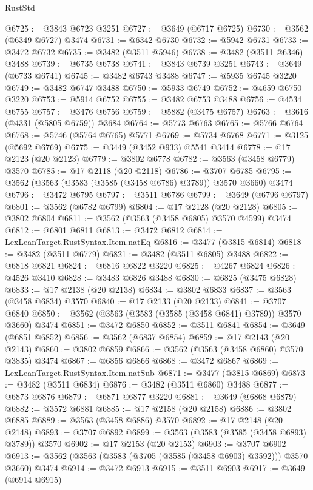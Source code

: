 \begin{lexlean}{RustStd}
\begin{coremodule}
{\begin{coremodule}
{{{{{{{{{{{{{{{{{{{{{{{{{{{{{{{{{{{{{{{{{{{{{@6725 := @3843 @6723 @3251
@6727 := @3649 (@6717 @6725)
@6730 := @3562 (@6349 @6727) @3474
@6731 := @6342 @6730
@6732 := @5942 @6731
@6733 := @3472 @6732
@6735 := @3482 (@3511 @5946)
@6738 := @3482 (@3511 @6346) @3488
@6739 := @6735 @6738
@6741 := @3843 @6739 @3251
@6743 := @3649 (@6733 @6741)
@6745 := @3482 @6743 @3488
@6747 := @5935 @6745 @3220
@6749 := @3482 @6747 @3488
@6750 := @5933 @6749
@6752 := @4659 @6750 @3220
@6753 := @5914 @6752
@6755 := @3482 @6753 @3488
@6756 := @4534 @6755
@6757 := @3476 @6756
@6759 := @5882 (@3475 @6757)
@6763 := @3616 (@4331 (@5805 @6759)) @3684
@6764 := @5773 @6763
@6765 := @5766 @6764
@6768 := @5746 (@5764 @6765) @5771
@6769 := @5734 @6768
@6771 := @3125 (@5692 @6769)
@6775 := @3449 (@3452 @933) @5541 @3414
@6778 := @17 @2123 (@20 @2123)
@6779 := @3802 @6778
@6782 := @3563 (@3458 @6779) @3570
@6785 := @17 @2118 (@20 @2118)
@6786 := @3707 @6785
@6795 := @3562 (@3563 (@3583 (@3585 (@3458 @6786) @3789)) @3570 @3660) @3474
@6796 := @3472 @6795
@6797 := @3511 @6786
@6799 := @3649 (@6796 @6797)
@6801 := @3562 (@6782 @6799)
@6804 := @17 @2128 (@20 @2128)
@6805 := @3802 @6804
@6811 := @3562 (@3563 (@3458 @6805) @3570 @4599) @3474
@6812 := @6801 @6811
@6813 := @3472 @6812
@6814 := LexLeanTarget.RustSyntax.Item.natEq
@6816 := @3477 (@3815 @6814)
@6818 := @3482 (@3511 @6779)
@6821 := @3482 (@3511 @6805) @3488
@6822 := @6818 @6821
@6824 := @6816 @6822 @3220
@6825 := @4267 @6824
@6826 := @4526 @3410
@6828 := @3483 @6826 @3488
@6830 := @6825 (@3475 @6828)
@6833 := @17 @2138 (@20 @2138)
@6834 := @3802 @6833
@6837 := @3563 (@3458 @6834) @3570
@6840 := @17 @2133 (@20 @2133)
@6841 := @3707 @6840
@6850 := @3562 (@3563 (@3583 (@3585 (@3458 @6841) @3789)) @3570 @3660) @3474
@6851 := @3472 @6850
@6852 := @3511 @6841
@6854 := @3649 (@6851 @6852)
@6856 := @3562 (@6837 @6854)
@6859 := @17 @2143 (@20 @2143)
@6860 := @3802 @6859
@6866 := @3562 (@3563 (@3458 @6860) @3570 @3835) @3474
@6867 := @6856 @6866
@6868 := @3472 @6867
@6869 := LexLeanTarget.RustSyntax.Item.natSub
@6871 := @3477 (@3815 @6869)
@6873 := @3482 (@3511 @6834)
@6876 := @3482 (@3511 @6860) @3488
@6877 := @6873 @6876
@6879 := @6871 @6877 @3220
@6881 := @3649 (@6868 @6879)
@6882 := @3572 @6881
@6885 := @17 @2158 (@20 @2158)
@6886 := @3802 @6885
@6889 := @3563 (@3458 @6886) @3570
@6892 := @17 @2148 (@20 @2148)
@6893 := @3707 @6892
@6899 := @3563 (@3583 (@3585 (@3458 @6893) @3789)) @3570
@6902 := @17 @2153 (@20 @2153)
@6903 := @3707 @6902
@6913 := @3562 (@3563 (@3583 (@3705 (@3585 (@3458 @6903) @3592))) @3570 @3660) @3474
@6914 := @3472 @6913
@6915 := @3511 @6903
@6917 := @3649 (@6914 @6915)
}}}}}}}}}}}}}}}}}}}}}}}}}}}}}}}}}}}}}}}}}}}}}
\end{coremodule}}
\end{coremodule}
\end{lexlean}
